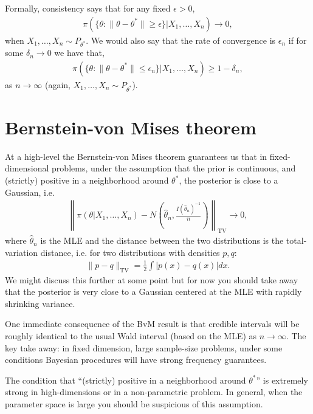 \documentclass[twoside,12pt]{article}
\begin{document}
Formally, consistency says that for any fixed $\epsilon > 0$,
\begin{align*}
\pi(\{\theta: \|\theta - \theta^*\| \geq \epsilon\} | X_1,\ldots, X_n) \rightarrow 0,   
\end{align*}
when $X_1,\ldots,X_n \sim P_{\theta^*}.$ We would also say that the rate of convergence is $\epsilon_n$ if for some $\delta_n \rightarrow 0$ we have that,
\begin{align*}
\pi(\{\theta: \|\theta - \theta^*\| \leq \epsilon_n\} | X_1,\ldots, X_n) \geq 1 - \delta_n, 
\end{align*}
as $n \rightarrow \infty$ (again, $X_1,\ldots,X_n \sim P_{\theta^*}$).

\section{Bernstein-von Mises theorem}
At a high-level the Bernstein-von Mises theorem guarantees us that in fixed-dimensional problems, under the assumption that the prior is continuous, and (strictly) positive in a neighborhood around $\theta^*$, the posterior is close to a Gaussian, i.e. 
\begin{align*}
\left\| \pi(\theta | X_1,\ldots,X_n) - N\left(\widehat{\theta}_n, \frac{I(\widehat{\theta}_n)^{-1}}{n}\right)\right\|_{\text{TV}} \rightarrow 0,
\end{align*}
where $\widehat{\theta}_n$ is the MLE and the distance between the two distributions is the total-variation distance, i.e. for two distributions with densities $p,q$:
\begin{align*}
\|p - q\|_{\text{TV}} = \frac{1}{2} \int |p(x) - q(x)| dx.
\end{align*} 
We might discuss this further at some point but for now you should take away that the posterior is very close to a Gaussian centered at the MLE with rapidly shrinking variance.

One immediate consequence of the BvM result is that credible intervals will be roughly identical to the usual Wald interval (based on the MLE) as $n \rightarrow \infty$. The key take away: in fixed dimension, large sample-size problems, under some conditions Bayesian procedures will have strong frequency guarantees.

The condition that ``(strictly) positive in a neighborhood around $\theta^*$'' is extremely strong in high-dimensions or in a non-parametric problem. In general, when the parameter space is large you should be suspicious of this assumption.
\end{document}
